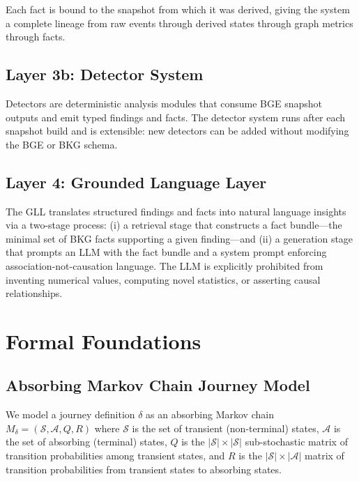 \documentclass[12pt, a4paper]{article}
\begin{document}
Each fact is bound to the snapshot from which it was derived, giving the system a complete lineage from raw events through derived states through graph metrics through facts.

\subsection{Layer 3b: Detector System}

Detectors are deterministic analysis modules that consume BGE snapshot outputs and emit typed findings and facts. The detector system runs after each snapshot build and is extensible: new detectors can be added without modifying the BGE or BKG schema.

\subsection{Layer 4: Grounded Language Layer}

The GLL translates structured findings and facts into natural language insights via a two-stage process: (i) a retrieval stage that constructs a fact bundle---the minimal set of BKG facts supporting a given finding---and (ii) a generation stage that prompts an LLM with the fact bundle and a system prompt enforcing association-not-causation language. The LLM is explicitly prohibited from inventing numerical values, computing novel statistics, or asserting causal relationships.

\section{Formal Foundations}
\label{sec:formal}

\subsection{Absorbing Markov Chain Journey Model}

We model a journey definition $\delta$ as an absorbing Markov chain $M_\delta = (\mathcal{S}, \mathcal{A}, Q, R)$ where $\mathcal{S}$ is the set of transient (non-terminal) states, $\mathcal{A}$ is the set of absorbing (terminal) states, $Q$ is the $|\mathcal{S}| \times |\mathcal{S}|$ sub-stochastic matrix of transition probabilities among transient states, and $R$ is the $|\mathcal{S}| \times |\mathcal{A}|$ matrix of transition probabilities from transient states to absorbing states.
\end{document}
